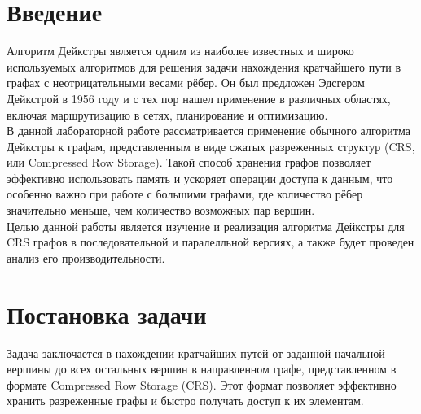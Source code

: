 \documentclass[12pt]{article}
\begin{document}
\newpage

\section*{Введение}
   Алгоритм Дейкстры является одним из наиболее известных и широко используемых алгоритмов для решения задачи нахождения кратчайшего пути в графах с неотрицательными весами рёбер. Он был предложен Эдсгером Дейкстрой в 1956 году и с тех пор нашел применение в различных областях, включая маршрутизацию в сетях, планирование и оптимизацию.\\

    В данной лабораторной работе рассматривается применение обычного алгоритма Дейкстры к графам, представленным в виде сжатых разреженных структур (CRS, или Compressed Row Storage). Такой способ хранения графов позволяет эффективно использовать память и ускоряет операции доступа к данным, что особенно важно при работе с большими графами, где количество рёбер значительно меньше, чем количество возможных пар вершин.\\

    Целью данной работы является изучение и реализация алгоритма Дейкстры для CRS графов в последовательной и паралелльной версиях, а также будет проведен анализ его производительности.


   



\newpage

\section{Постановка задачи}
Задача заключается в нахождении кратчайших путей от заданной начальной вершины до всех остальных вершин в направленном графе, представленном в формате Compressed Row Storage (CRS). Этот формат позволяет эффективно хранить разреженные графы и быстро получать доступ к их элементам.
\end{document}
